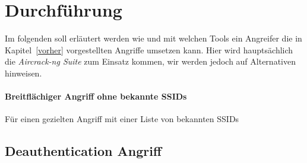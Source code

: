 \section{Durchführung}
Im folgenden soll erläutert werden wie und mit welchen Tools ein Angreifer die in Kapitel~\ref{vorher} vorgestellten Angriffe umsetzen kann.
Hier wird hauptsächlich die \textit{Aircrack-ng Suite} zum Einsatz kommen, wir werden jedoch auf Alternativen hinweisen.



\paragraph{Breitflächiger Angriff ohne bekannte SSIDs}

Für einen gezielten Angriff mit einer Liste von bekannten SSIDs

\subsection{Deauthentication Angriff}
